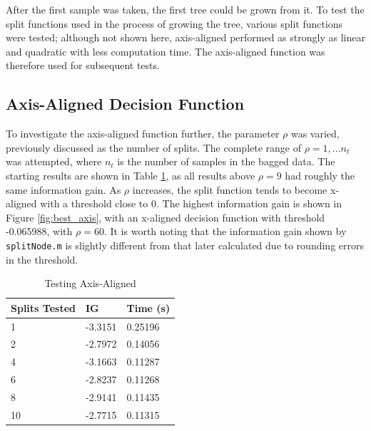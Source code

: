 \documentclass[a4paper, 10pt, conference]{ieeeconf}
\begin{document}
After the first sample was taken, the first tree could be grown from it. To test the split functions used in the process of growing the tree, various split functions were tested; although not shown here, axis-aligned performed as strongly as linear and quadratic with less computation time. The axis-aligned function was therefore used for subsequent tests. 

\subsection{Axis-Aligned Decision Function}

To investigate the axis-aligned function further, the parameter $\rho$ was varied, previously discussed as the number of splits. The complete range of $\rho=1,...n_{t}$ was attempted, where $n_t$ is the number of samples in the bagged data. The starting results are shown in Table \ref{tbl:axis_aligned_test}, as all results above $\rho=9$ had roughly the same information gain. As $\rho$ increases, the split function tends to become x-aligned with a threshold close to 0. The highest information gain is shown in Figure \ref{fig:best_axis}, with an x-aligned decision function with threshold -0.065988, with $\rho=60$. It is worth noting that the information gain shown by \texttt{splitNode.m} is slightly different from that later calculated due to rounding errors in the threshold.


\begin{table}[!ht]
	\centering
    \caption{Testing Axis-Aligned}
    \label{tbl:axis_aligned_test}
	\begin{tabular}{|lll|}
    	\hline
        \textbf{Splits Tested} & \textbf{IG} & \textbf{Time (s)} \\ \hline
        1 & -3.3151 & 0.25196 \\
        2 & -2.7972 & 0.14056  \\
        4 & -3.1663 & 0.11287  \\
        6 & -2.8237 & 0.11268  \\
        8 & -2.9141 & 0.11435  \\
        10 & -2.7715 & 0.11315 \\ \hline
	\end{tabular}
\end{table}
\end{document}
